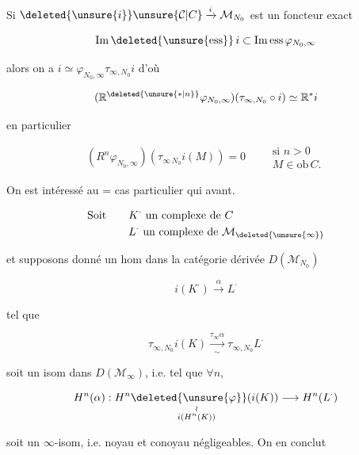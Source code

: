 Si $\deleted{\unsure{i}}\unsure{\mathcal C|C}\xrightarrow{i}\mathcal M_{N_0}$ est un foncteur exact

\[
\operatorname{Im}\deleted{\unsure{\mathrm{ess}}}\,i\subset\operatorname{Im\,ess}\varphi_{N_0,\infty}
\]

alors on a $i\simeq\varphi_{N_0,\infty}\tau_{\infty,N_0}i$ d'où

\[
(\mathbb R^{\deleted{\unsure{*|n}}}\varphi_{N_0,\infty})(\tau_{\infty,N_0}\circ i)\simeq\mathbb R^*i
\]

en particulier

\[
(R^n\varphi_{N_0,\infty})(\tau_{\infty\,N_0}i(M))=0
\qquad\begin{gathered}\text{si }n>0\\ M\in\mathrm{ob}\,C.\end{gathered}
\]

On est intéressé au = cas particulier qui avant.


\[
\begin{aligned}
\text{Soit}\qquad &K^\cdot\text{ un complexe de }C\\
&L^\cdot\text{ un complexe de }\mathcal M_{\deleted{\unsure{\infty}}}
\end{aligned}
\]

et supposons donné un hom dans la catégorie dérivée $D(\mathcal M_{N_0})$

\[
i(K^\cdot)\xrightarrow{\alpha}L^\cdot
\]

tel que

\[
\tau_{\infty,N_0}i(K)\xrightarrow[\sim]{\tau_\infty\alpha}\tau_{\infty,N_0}L^\cdot
\]

soit un isom dans $D(\mathcal M_\infty)$, i.e. tel que $\forall n$,

\[
H^n(\alpha):\underset{\substack{\wr\\ i(H^n(K))}}{H^{n}\deleted{\unsure{\varphi}}(i(K))}\longrightarrow H^n(L^\cdot)
\]

soit un $\infty$-isom, i.e. noyau et conoyau  négligeables. On en conclut


